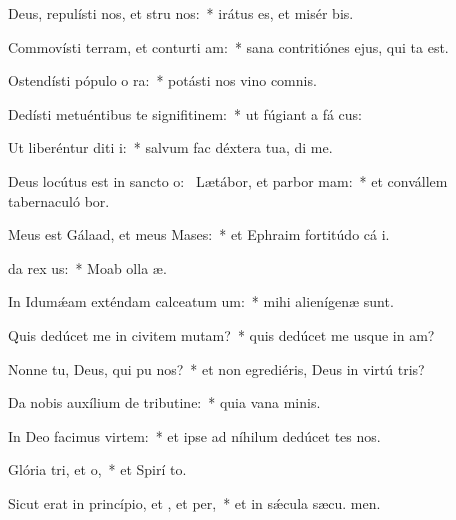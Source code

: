 \item Deus, repulísti nos, et stru nos:~* irátus es, et misér  bis.
\item Commovísti terram, et conturti am:~* sana contritiónes ejus, qui ta est.
\item Ostendísti pópulo o ra:~* potásti nos vino comnis.
\item Dedísti metuéntibus te signifitinem:~* ut fúgiant a fá cus:
\item Ut liberéntur diti i:~* salvum fac déxtera tua,  di me.
\item Deus locútus est in sancto o:~\pscross{} Lætábor, et parbor mam:~* et convállem tabernaculó bor.
\item Meus est Gálaad, et meus  Mases:~* et Ephraim fortitúdo cá i.
\item {}da rex us:~* Moab olla  æ.
\item In Idumǽam exténdam calceatum um:~* mihi alienígenæ  sunt.
\item Quis dedúcet me in civitem mutam?~* quis dedúcet me usque in am?
\item Nonne tu, Deus, qui pu nos?~* et non egrediéris, Deus in virtú tris?
\item Da nobis auxílium de tributine:~* quia vana  minis.
\item In Deo facimus virtem:~* et ipse ad níhilum dedúcet tes nos.
\item Glória tri, et o,~* et Spirí to.
\item Sicut erat in princípio, et , et per,~* et in sǽcula sæcu. men.
